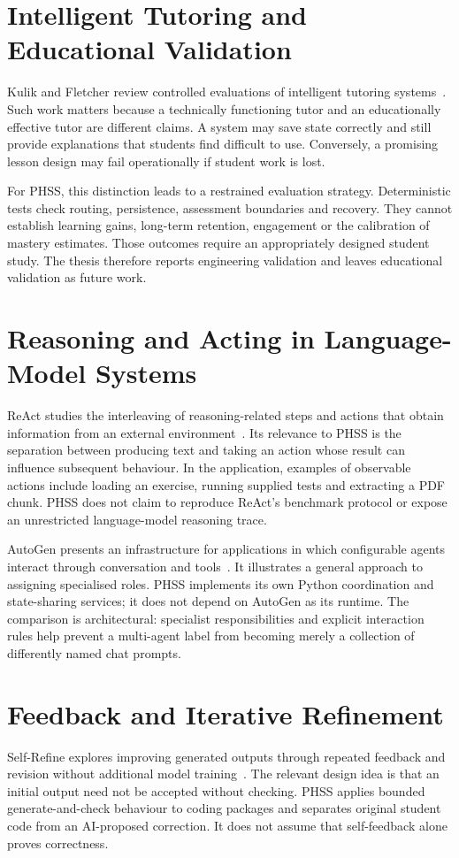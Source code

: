 \section{Intelligent Tutoring and Educational Validation}
Kulik and Fletcher review controlled evaluations of intelligent tutoring systems~\cite{kulik2016}. Such work matters because a technically functioning tutor and an educationally effective tutor are different claims. A system may save state correctly and still provide explanations that students find difficult to use. Conversely, a promising lesson design may fail operationally if student work is lost.

For PHSS, this distinction leads to a restrained evaluation strategy. Deterministic tests check routing, persistence, assessment boundaries and recovery. They cannot establish learning gains, long-term retention, engagement or the calibration of mastery estimates. Those outcomes require an appropriately designed student study. The thesis therefore reports engineering validation and leaves educational validation as future work.

\section{Reasoning and Acting in Language-Model Systems}
ReAct studies the interleaving of reasoning-related steps and actions that obtain information from an external environment~\cite{yao2022}. Its relevance to PHSS is the separation between producing text and taking an action whose result can influence subsequent behaviour. In the application, examples of observable actions include loading an exercise, running supplied tests and extracting a PDF chunk. PHSS does not claim to reproduce ReAct's benchmark protocol or expose an unrestricted language-model reasoning trace.

AutoGen presents an infrastructure for applications in which configurable agents interact through conversation and tools~\cite{wu2023}. It illustrates a general approach to assigning specialised roles. PHSS implements its own Python coordination and state-sharing services; it does not depend on AutoGen as its runtime. The comparison is architectural: specialist responsibilities and explicit interaction rules help prevent a multi-agent label from becoming merely a collection of differently named chat prompts.

\section{Feedback and Iterative Refinement}
Self-Refine explores improving generated outputs through repeated feedback and revision without additional model training~\cite{madaan2023}. The relevant design idea is that an initial output need not be accepted without checking. PHSS applies bounded generate-and-check behaviour to coding packages and separates original student code from an AI-proposed correction. It does not assume that self-feedback alone proves correctness.

